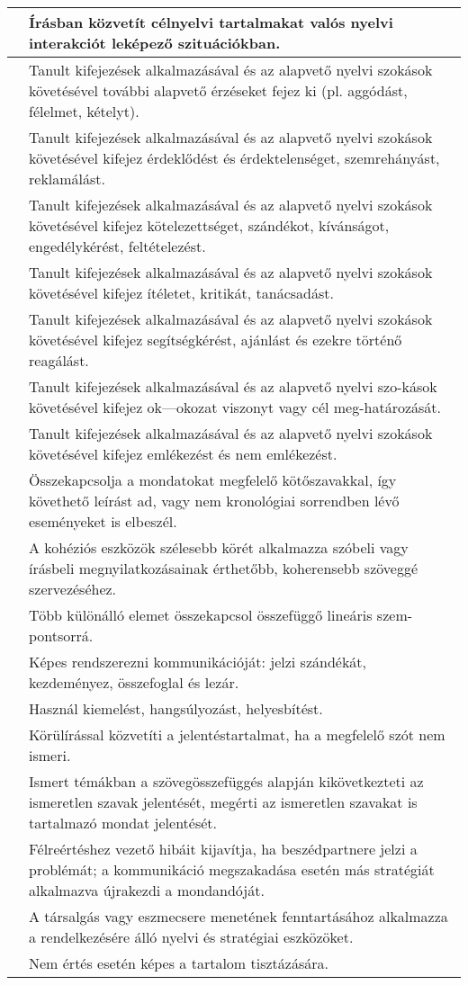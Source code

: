 \begin{longtable}[]{p{\evflength}@{\strut}>{\begin{minipage}{\columnlength}\strut}l<{\strut\end{minipage}}}
\hline
&
  Írásban közvetít célnyelvi tartalmakat valós nyelvi interakciót
  leképező szituációkban.
\tabularnewline
\hline
&
  Tanult kifejezések alkalmazásával és az alapvető nyelvi szokások
  követésével további alapvető érzéseket fejez ki (pl. aggódást,
  félelmet, kételyt).
\tabularnewline
\hline
&
  Tanult kifejezések alkalmazásával és az alapvető nyelvi szokások
  követésével kifejez érdeklődést és érdektelenséget, szemrehányást,
  reklamálást.
\tabularnewline
\hline
&
  Tanult kifejezések alkalmazásával és az alapvető nyelvi szokások
  követésével kifejez kötelezettséget, szándékot, kívánságot,
  engedélykérést, feltételezést.
\tabularnewline
\hline
&
  Tanult kifejezések alkalmazásával és az alapvető nyelvi szokások
  követésével kifejez ítéletet, kritikát, tanácsadást.
\tabularnewline
\hline
&
  Tanult kifejezések alkalmazásával és az alapvető nyelvi szokások
  követésével kifejez segítségkérést, ajánlást és ezekre történő
  reagálást.
\tabularnewline
\hline
&
  Tanult kifejezések alkalmazásával és az alapvető nyelvi szo-\break kások
  követésével kifejez ok---okozat viszonyt vagy cél meg-\break határozását.
\tabularnewline
\hline
&
  Tanult kifejezések alkalmazásával és az alapvető nyelvi szokások
  követésével kifejez emlékezést és nem emlékezést.
\tabularnewline
\hline
&
  Összekapcsolja a mondatokat megfelelő kötőszavakkal, így követhető
  leírást ad, vagy nem kronológiai sorrendben lévő eseményeket is
  elbeszél.
\tabularnewline
\hline
&
  A kohéziós eszközök szélesebb körét alkalmazza szóbeli vagy írásbeli
  megnyilatkozásainak érthetőbb, koherensebb szöveggé szervezéséhez.
\tabularnewline
\hline
&
  Több különálló elemet összekapcsol összefüggő lineáris szem-\break pontsorrá.
\tabularnewline
\hline
&
  Képes rendszerezni kommunikációját: jelzi szándékát, kezdeményez,
  összefoglal és lezár.
\tabularnewline
\hline
&
  Használ kiemelést, hangsúlyozást, helyesbítést.
\tabularnewline
\hline
&
  Körülírással közvetíti a jelentéstartalmat, ha a megfelelő szót nem
  ismeri.
\tabularnewline
\hline
&
  Ismert témákban a szövegösszefüggés alapján kikövetkezteti az
  ismeretlen szavak jelentését, megérti az ismeretlen szavakat is
  tartalmazó mondat jelentését.
\tabularnewline
\hline
&
  Félreértéshez vezető hibáit kijavítja, ha beszédpartnere jelzi a
  problémát; a kommunikáció megszakadása esetén más stratégiát
  alkalmazva újrakezdi a mondandóját.
\tabularnewline
\hline
&
  A társalgás vagy eszmecsere menetének fenntartásához alkalmazza a
  rendelkezésére álló nyelvi és stratégiai eszközöket.
\tabularnewline
\hline
&
  Nem értés esetén képes a tartalom tisztázására.

\end{longtable}
